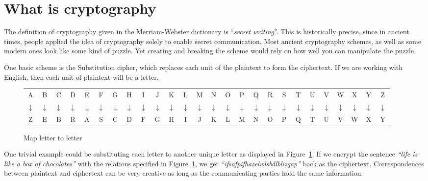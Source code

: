 \section{What is cryptography}
\par The definition of cryptography\cite{cryptography} given in the Merriam-Webster dictionary is ``\textit{secret writing}''. This is historically precise, since in ancient times, people applied the idea of cryptography solely to enable secret communication. Most ancient cryptography schemes, as well as some modern ones look like some kind of puzzle. Yet creating and breaking the scheme would rely on how well you can manipulate the puzzle.
\par One basic scheme is the Substitution cipher, which replaces each unit of the plaintext to form the ciphertext. If we are working with English, then each unit of plaintext will be a letter.
\begin{figure}[ht]
    \centering
    \setlength\tabcolsep{3pt}
        \begin{tabular}{cccccccccccccccccccccccccc}
        A & B & C & D & E & F & G & H & I & J & K & L & M & N & O & P & Q & R & S & T & U & V & W & X & Y & Z \\
        $\downarrow$ & $\downarrow$ & $\downarrow$ & $\downarrow$ & $\downarrow$ & $\downarrow$ & $\downarrow$ & $\downarrow$ & $\downarrow$ & $\downarrow$ & $\downarrow$ & $\downarrow$ & $\downarrow$ & $\downarrow$ & $\downarrow$ & $\downarrow$ & $\downarrow$ & $\downarrow$ & $\downarrow$ & $\downarrow$ & $\downarrow$ & $\downarrow$ & $\downarrow$ & $\downarrow$ & $\downarrow$ & $\downarrow$ \\
        Z & E & B & R & A & S & C & D & F & G & H & I & J & K & L & M & N & O & P & Q & T & U & V & W & X & Y \\
    \end{tabular}
    \caption{Map letter to letter}\label{fig:replace-letter-by-letter}
\end{figure}
One trivial example could be substituting each letter to another unique letter as displayed in Figure~\ref{fig:replace-letter-by-letter}. If we encrypt the sentence \textit{``life is like a box of chocolates''} with the relations specified in Figure~\ref{fig:replace-letter-by-letter}, we get \textit{``ifsafpifhazelwlsbdlblizqap''} back as the ciphertext. Correspondences between plaintext and ciphertext can be very creative as long as the communicating parties hold the same information. 
